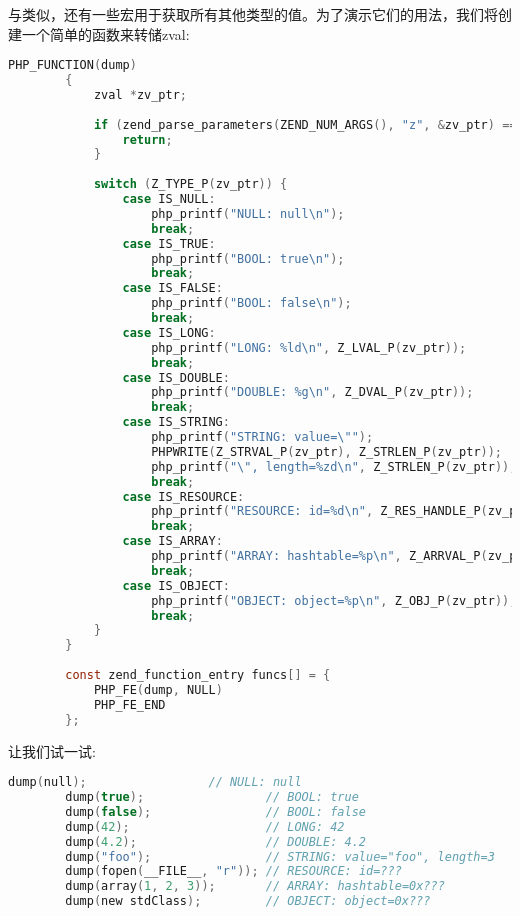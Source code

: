 与类似，还有一些宏用于获取所有其他类型的值。为了演示它们的用法，我们将创建一个简单的函数来转储zval:

\begin{lstlisting}[language=c]
        PHP_FUNCTION(dump)
        {
            zval *zv_ptr;
        
            if (zend_parse_parameters(ZEND_NUM_ARGS(), "z", &zv_ptr) == FAILURE) {
                return;
            }
        
            switch (Z_TYPE_P(zv_ptr)) {
                case IS_NULL:
                    php_printf("NULL: null\n");
                    break;
                case IS_TRUE:
                    php_printf("BOOL: true\n");
                    break;
                case IS_FALSE:
                    php_printf("BOOL: false\n");
                    break;
                case IS_LONG:
                    php_printf("LONG: %ld\n", Z_LVAL_P(zv_ptr));
                    break;
                case IS_DOUBLE:
                    php_printf("DOUBLE: %g\n", Z_DVAL_P(zv_ptr));
                    break;
                case IS_STRING:
                    php_printf("STRING: value=\"");
                    PHPWRITE(Z_STRVAL_P(zv_ptr), Z_STRLEN_P(zv_ptr));
                    php_printf("\", length=%zd\n", Z_STRLEN_P(zv_ptr));
                    break;
                case IS_RESOURCE:
                    php_printf("RESOURCE: id=%d\n", Z_RES_HANDLE_P(zv_ptr));
                    break;
                case IS_ARRAY:
                    php_printf("ARRAY: hashtable=%p\n", Z_ARRVAL_P(zv_ptr));
                    break;
                case IS_OBJECT:
                    php_printf("OBJECT: object=%p\n", Z_OBJ_P(zv_ptr));
                    break;
            }
        }
        
        const zend_function_entry funcs[] = {
            PHP_FE(dump, NULL)
            PHP_FE_END
        };        
\end{lstlisting}

让我们试一试:

\begin{lstlisting}[language=c]
        dump(null);                 // NULL: null
        dump(true);                 // BOOL: true
        dump(false);                // BOOL: false
        dump(42);                   // LONG: 42
        dump(4.2);                  // DOUBLE: 4.2
        dump("foo");                // STRING: value="foo", length=3
        dump(fopen(__FILE__, "r")); // RESOURCE: id=???
        dump(array(1, 2, 3));       // ARRAY: hashtable=0x???
        dump(new stdClass);         // OBJECT: object=0x???        
\end{lstlisting}

